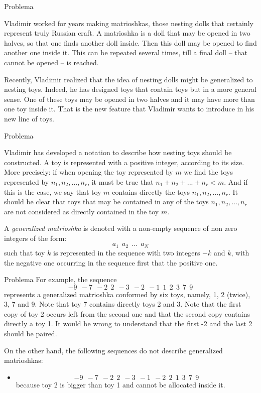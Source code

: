 
\begin{frame}[fragile]{Problema}

Vladimir worked for years making matrioshkas, those nesting dolls that certainly represent truly 
Russian craft. A matrioshka is a doll that may be opened in two halves, so that one finds another 
doll inside.  Then this doll may be opened to find another one inside it. This can be repeated 
several times, till a final doll -- that cannot be opened -- is reached.

Recently, Vladimir realized that the idea of nesting dolls might be generalized to nesting toys.
Indeed, he has designed toys that contain toys but in a more general sense. One of these toys may
be opened in two halves and it may have more than one toy inside it. That is the new feature that
Vladimir wants to introduce in his new line of toys.
\end{frame}

\begin{frame}[fragile]{Problema}

Vladimir has developed a notation to describe how nesting toys should be constructed. A toy
is represented with a positive integer, according to its size. More precisely: if when opening the 
toy represented by $m$ we find the toys represented by $n_1, n_2, \ldots, n_r$, it must be true 
that $n_1+n_2+. . .+n_r < m$. And if this is the case, we say that toy $m$ contains directly the 
toys $n_1, n_2, \ldots, n_r$. It should be clear that toys that may be contained in any of the toys 
$n_1, n_2, \ldots, n_r$ are not considered as directly contained in the toy $m$.

A \textit{generalized matrioshka} is denoted with a non-empty sequence of non zero integers of the 
form:
\[
a_1\ \ a_2\ \ \ldots\ \ a_N
\]
such that toy $k$ is represented in the sequence with two integers $-k$ and $k$, with the negative 
one occurring in the sequence first that the positive one.

\end{frame}

\begin{frame}[fragile]{Problema}
For example, the sequence
\[
-9\ \ -7\ \ -2\ \ 2\ \ -3\ \ -2\ \ -1\ \ 1\ \ 2\ \ 3\ \ 7\ \ 9
\]
represents a generalized matrioshka conformed by six toys, namely, 1, 2 (twice), 3, 7 and 9. 
Note that toy 7 contains directly toys 2 and 3. Note that the first copy of toy 2 occurs left 
from the second one and that the second copy contains directly a toy 1. It would be wrong to 
understand that the first -2 and the last 2 should be paired.

On the other hand, the following sequences do not describe generalized matrioshkas:
\begin{itemize}
\item
\[
-9\ \ -7\ \ -2\ \ 2\ \ -3\ \ -1\ \ -2\ \ 2\ \ 1\ \ 3\ \ 7\ \ 9
\]
because toy 2 is bigger than toy 1 and cannot be allocated inside it.
\end{itemize}
\end{frame}

